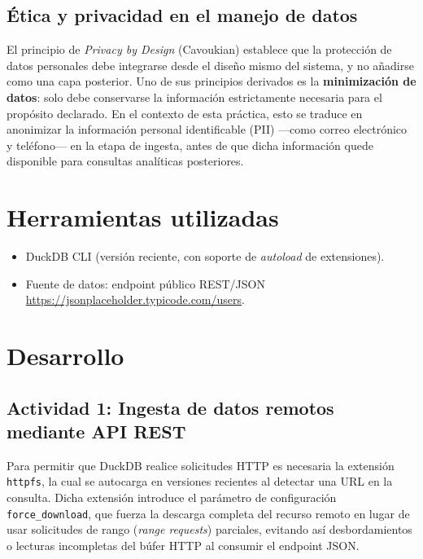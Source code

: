 \documentclass[12pt,letterpaper]{article}
\begin{document}
\subsection{Ética y privacidad en el manejo de datos}
El principio de \textit{Privacy by Design} (Cavoukian) \cite{privacy-by-design} establece que la
protección de datos personales debe integrarse desde el diseño mismo del
sistema, y no añadirse como una capa posterior. Uno de sus principios
derivados es la \textbf{minimización de datos}: solo debe conservarse la
información estrictamente necesaria para el propósito declarado.\cite{gdpr_art25} En el
contexto de esta práctica, esto se traduce en anonimizar la información
personal identificable (PII) —como correo electrónico y teléfono— en la
etapa de ingesta, antes de que dicha información quede disponible para
consultas analíticas posteriores.


\section{Herramientas utilizadas}
 
\begin{itemize}
    \item DuckDB CLI (versión reciente, con soporte de \textit{autoload} de extensiones).
    \item Fuente de datos: endpoint público REST/JSON
    \url{https://jsonplaceholder.typicode.com/users}. \cite{jsonplaceholder}
\end{itemize} 


\section{Desarrollo}
 
\subsection{Actividad 1: Ingesta de datos remotos mediante API REST}
 
Para permitir que DuckDB realice solicitudes HTTP es necesaria la extensión
\texttt{httpfs}, la cual se autocarga en versiones recientes al detectar una
URL en la consulta. Dicha extensión introduce el parámetro de configuración
\texttt{force\_download}, que fuerza la descarga completa del recurso remoto
en lugar de usar solicitudes de rango (\textit{range requests}) parciales,
evitando así desbordamientos o lecturas incompletas del búfer HTTP al
consumir el endpoint JSON.
 
\end{document}
